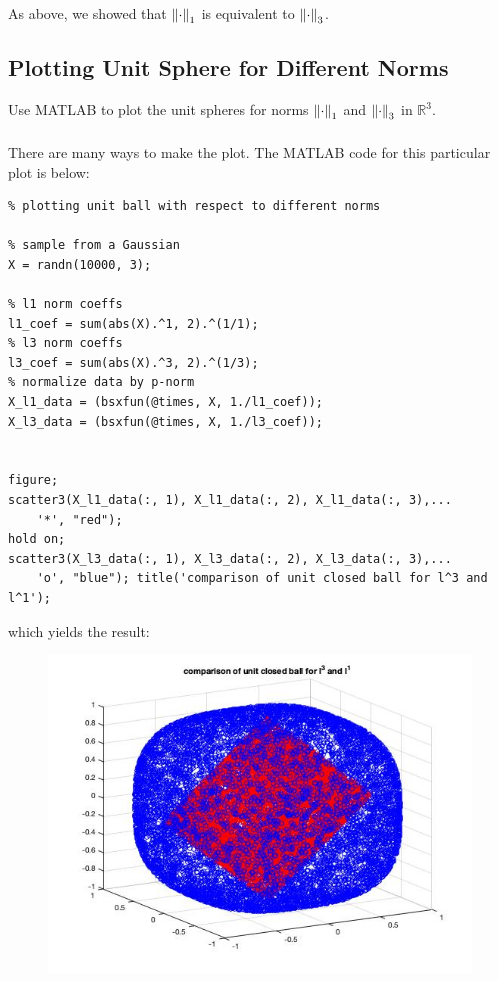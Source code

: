 \documentclass[12pt]{article} %
\newcommand{\rr}{\mathbb{R}}
\newcommand{\1}[1]{\mathds{1}\left[#1\right]}
\begin{document}
As above, we showed that $\norm{\cdot}_1$ is equivalent to $\norm{\cdot}_3$.



\newpage
\subsection{Plotting Unit Sphere for Different Norms}
Use MATLAB to plot the unit spheres for norms $\norm{\cdot}_1$ and $\norm{\cdot}_3$ in $\rr^3$.

\subsubsection{}
There are many ways to make the plot. The MATLAB code for this particular plot is below:
\begin{verbatim}
% plotting unit ball with respect to different norms

% sample from a Gaussian
X = randn(10000, 3);

% l1 norm coeffs
l1_coef = sum(abs(X).^1, 2).^(1/1); 
% l3 norm coeffs
l3_coef = sum(abs(X).^3, 2).^(1/3); 
% normalize data by p-norm 
X_l1_data = (bsxfun(@times, X, 1./l1_coef)); 
X_l3_data = (bsxfun(@times, X, 1./l3_coef)); 


figure; 
scatter3(X_l1_data(:, 1), X_l1_data(:, 2), X_l1_data(:, 3),...
    '*', "red"); 
hold on; 
scatter3(X_l3_data(:, 1), X_l3_data(:, 2), X_l3_data(:, 3),...
    'o', "blue"); title('comparison of unit closed ball for l^3 and l^1');
\end{verbatim} which yields the result:
\newpage
\begin{figure}[t]
\includegraphics[width=12cm]{p2plot.jpg}
\centering
\end{figure}
\newpage
\end{document}
